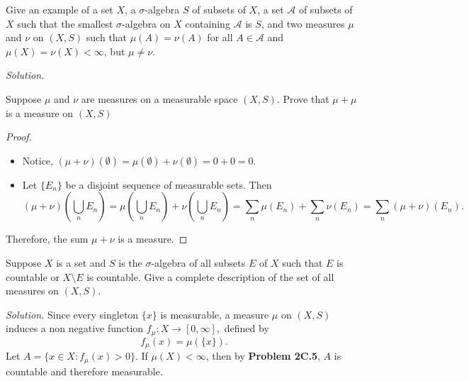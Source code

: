 \documentclass[14.5pt]{article}
\newcommand{\R}{\mathbb{R}}
\newenvironment{problem}[2][Problem]{\begin{mdframed}[backgroundcolor=gray!10, leftline = false, rightline=false, linewidth=0.25pt]  \begin{trivlist}
\item[\hskip \labelsep {\bfseries #1}\hskip \labelsep {\bfseries #2.}]}{\end{trivlist} \end{mdframed}  }
\begin{document}
\begin{problem}{2C.8}
Give an example of a set $X$, a $\sigma$-algebra $S$ of subsets of $X$, a set $\mathcal A$ of subsets of $X$ such that the smallest $\sigma$-algebra on $X$ containing $\mathcal A$ is $S$, and two measures $\mu$ and
$\nu$ on $(X, S)$ such that $\mu(A) = \nu(A)$ for all $A \in \mathcal{A}$ and $\mu(X) = \nu(X) < \infty$, but $\mu \neq \nu$.
\end{problem}
\textit{Solution.} 

\begin{problem}{2C.9}
Suppose $\mu$ and $\nu$ are measures on a measurable space $(X, S)$. Prove that $\mu + \mu$
is a measure on $(X, S)$
\end{problem}
\begin{proof}
    \text{ }
    \begin{itemize}
        \item Notice, $(\mu + \nu)(\emptyset) = \mu(\emptyset) + \nu(\emptyset) = 0 + 0 = 0.$
        \item Let $\{E_n\}$ be a disjoint sequence of measurable sets. Then
        $$(\mu + \nu)\left(\bigcup_n E_n\right) = \mu\left(\bigcup_n E_n\right) + \nu \left(\bigcup_n E_n\right) = \sum_n \mu(E_n) + \sum_n \nu(E_n) = \sum_n (\mu + \nu)(E_n).$$
    \end{itemize}
Therefore, the sum $\mu + \nu$ is a measure.
\end{proof}

\begin{problem}{2C.12}
Suppose $X$ is a set and $S$ is the $\sigma$-algebra of all subsets $E$ of $X$ such that $E$ is countable or $X \setminus E$ is countable. Give a complete description of the set of all measures on $(X, S)$.
\end{problem}
\textit{Solution.} Since every singleton $\{x\}$ is measurable, a measure $\mu$ on $(X, S)$ induces a non negative function $f_\mu: X \rightarrow [0, \infty],$ defined by
$$f_\mu(x) = \mu(\{x\}).$$
Let $A = \{ x \in X: f_\mu(x) > 0\}.$ If $\mu(X) < \infty$, then by \textbf{Problem 2C.5}, $A$ is countable and therefore measurable. 
\end{document}
